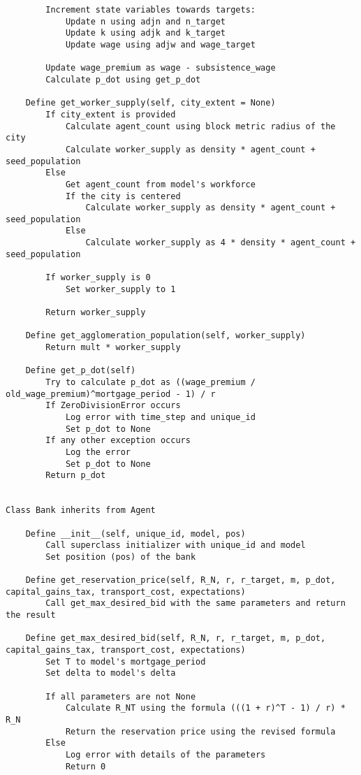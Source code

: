 {\begin{verbatim}
        Increment state variables towards targets:
            Update n using adjn and n_target
            Update k using adjk and k_target
            Update wage using adjw and wage_target
            
        Update wage_premium as wage - subsistence_wage
        Calculate p_dot using get_p_dot

    Define get_worker_supply(self, city_extent = None)
        If city_extent is provided
            Calculate agent_count using block metric radius of the city
            Calculate worker_supply as density * agent_count + seed_population
        Else
            Get agent_count from model's workforce
            If the city is centered
                Calculate worker_supply as density * agent_count + seed_population
            Else
                Calculate worker_supply as 4 * density * agent_count + seed_population
        
        If worker_supply is 0
            Set worker_supply to 1
        
        Return worker_supply

    Define get_agglomeration_population(self, worker_supply)
        Return mult * worker_supply

    Define get_p_dot(self)
        Try to calculate p_dot as ((wage_premium / old_wage_premium)^mortgage_period - 1) / r
        If ZeroDivisionError occurs
            Log error with time_step and unique_id
            Set p_dot to None
        If any other exception occurs
            Log the error
            Set p_dot to None
        Return p_dot


Class Bank inherits from Agent

    Define __init__(self, unique_id, model, pos)
        Call superclass initializer with unique_id and model
        Set position (pos) of the bank

    Define get_reservation_price(self, R_N, r, r_target, m, p_dot, capital_gains_tax, transport_cost, expectations)
        Call get_max_desired_bid with the same parameters and return the result

    Define get_max_desired_bid(self, R_N, r, r_target, m, p_dot, capital_gains_tax, transport_cost, expectations)
        Set T to model's mortgage_period
        Set delta to model's delta

        If all parameters are not None
            Calculate R_NT using the formula (((1 + r)^T - 1) / r) * R_N
            Return the reservation price using the revised formula
        Else
            Log error with details of the parameters
            Return 0


\end{verbatim}}
